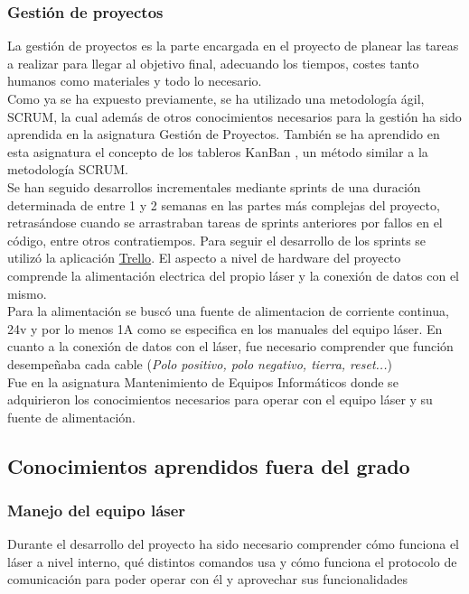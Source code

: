 	\subsubsection{Gestión de proyectos}
		La gestión de proyectos es la parte encargada en el proyecto de planear las tareas a realizar para llegar al objetivo final, adecuando los tiempos, costes tanto humanos como 				materiales y todo lo necesario. \\ Como ya se ha expuesto previamente, se ha utilizado una metodología ágil, SCRUM, la cual además de otros conocimientos necesarios para la 				gestión ha sido aprendida en la asignatura Gestión de Proyectos. También se ha aprendido en esta asignatura el concepto de los tableros KanBan \cite{wiki:Tableros_Kanban}
		, un método similar a la metodología SCRUM.\\
Se han seguido desarrollos incrementales mediante sprints de una duración determinada de entre 1 y 2 semanas en las partes más complejas del proyecto, retrasándose cuando se arrastraban tareas de sprints anteriores por fallos en el código, entre otros contratiempos. Para seguir el desarrollo de los sprints se utilizó la aplicación \href{https://trello.com/}{Trello}.
		El aspecto a nivel de hardware del proyecto comprende  la alimentación electrica del propio láser y la conexión de datos con el mismo.\\
		Para la alimentación se buscó una fuente de alimentacion de corriente continua, 24v y por lo menos 1A como se especifica en los manuales del equipo láser.
		En cuanto a la conexión de datos con el láser, fue necesario comprender que función desempeñaba cada cable (\textit{Polo positivo, polo negativo, tierra, reset...})\\
		Fue en la asignatura Mantenimiento de Equipos Informáticos donde se adquirieron los conocimientos necesarios para operar con el equipo láser y su fuente de alimentación.\\

	
	\subsection{Conocimientos aprendidos fuera del grado}


		\subsubsection{Manejo del equipo láser}
			Durante el desarrollo del proyecto ha sido necesario comprender cómo funciona el láser a nivel interno, qué distintos comandos usa y cómo funciona el protocolo de 						comunicación para poder operar con él y aprovechar sus funcionalidades\\

